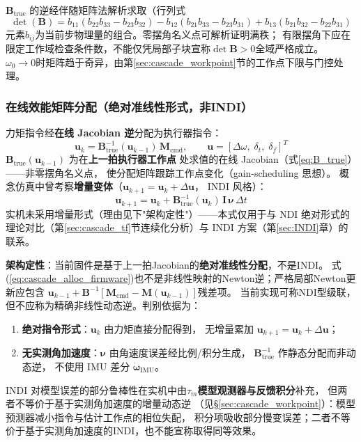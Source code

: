 $\mathbf{B}_{\mathrm{true}}$ 的逆经伴随矩阵法解析求取（行列式
\begin{equation}
    \det(\mathbf{B}) = b_{11}(b_{22}b_{33}-b_{23}b_{32}) - b_{12}(b_{21}b_{33}-b_{23}b_{31}) + b_{13}(b_{21}b_{32}-b_{22}b_{31})
    \label{eq:B_det}
\end{equation}
元素$b_{ij}$为当前步物理量的组合。零摆角名义点可解析证明满秩；
有限摆角下应在限定工作域检查条件数，不能仅凭局部子块宣称$\det\mathbf B>0$全域严格成立。
$\omega_0\to0$时矩阵趋于奇异，由第\ref{sec:cascade_workpoint}节的工作点下限与门控处理。

\subsubsection{在线效能矩阵分配（绝对准线性形式，非INDI）}
\label{sec:cascade_alloc}

力矩指令经\textbf{在线 Jacobian 逆}分配为执行器指令：
\begin{equation}
    \mathbf{u}_k = \mathbf{B}_{\mathrm{true}}^{-1}(\mathbf{u}_{k-1})\,
                   \mathbf{M}_{\mathrm{cmd}},
    \qquad \mathbf{u} = [\Delta\omega,\;\delta_t,\;\delta_f]^T
    \label{eq:cascade_alloc_firmware}
\end{equation}
$\mathbf{B}_{\mathrm{true}}(\mathbf{u}_{k-1})$ 为在\textbf{上一拍执行器工作点}
处求值的在线 Jacobian（式\ref{eq:B_true}）——非零摆角名义点，
使分配矩阵跟踪工作点变化（gain-scheduling 思想）。
概念仿真中曾考察\textbf{增量变体}（$\mathbf{u}_{k+1}=\mathbf{u}_k+\Delta\mathbf{u}$，
INDI 风格）：
\begin{equation}
    \mathbf{u}_{k+1} = \mathbf{u}_k
        + \mathbf{B}_{\mathrm{true}}^{-1}(\mathbf{u}_k)\,
          \mathbf{I}\,\boldsymbol{\nu}\,\Delta t
    \label{eq:cascade_alloc_ch}
\end{equation}
实机未采用增量形式（理由见下"架构定性"）——本式仅用于与 NDI 绝对形式的
理论对比（第\ref{sec:cascade_tf}节连续化分析）与 INDI 方案（第\ref{sec:INDI}章）的
联系。

\textbf{架构定性}：当前固件是基于上一拍Jacobian的\textbf{绝对准线性分配}，不是INDI。
式(\ref{eq:cascade_alloc_firmware})也不是非线性映射的Newton逆；严格局部Newton更新应包含
$\mathbf u_{k-1}+\mathbf B^{-1}[\mathbf M_{\mathrm{cmd}}-\mathbf M(\mathbf u_{k-1})]$残差项。
当前实现可称NDI型级联，但不应称为精确非线性动态逆。判别依据为：
\begin{enumerate}[label=(\arabic*)]
    \item \textbf{绝对指令形式}：$\mathbf{u}_k$ 由力矩直接分配得到，
          无增量累加 $\mathbf{u}_{k+1}=\mathbf{u}_k+\Delta\mathbf{u}$；
    \item \textbf{无实测角加速度}：$\boldsymbol{\nu}$ 由角速度误差经比例/积分生成，
          $\mathbf{B}_{\mathrm{true}}^{-1}$ 作静态分配而非动态逆，
          不使用 IMU 差分 $\dot{\boldsymbol{\omega}}_{\mathrm{IMU}}$。
\end{enumerate}
INDI 对模型误差的部分鲁棒性在实机中由\textbf{$\tau_m$模型观测器与反馈积分}补充，
但两者不等价于基于实测角加速度的增量动态逆
（见§\ref{sec:cascade_workpoint}）：模型预测器减小指令与估计工作点的相位失配，
积分项吸收部分慢变误差；二者不等价于基于实测角加速度的INDI，也不能宣称取得同等效果。

